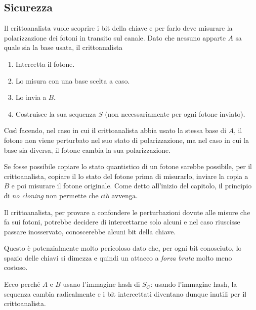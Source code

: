 \subsection{Sicurezza}
Il crittoanalista vuole scoprire i bit della chiave e per farlo deve misurare la polarizzazione dei fotoni in transito
sul canale. Dato che nessuno apparte $A$ sa quale sia la base usata, il crittoanalista
\begin{enumerate}
	\item Intercetta il fotone.
	\item Lo misura con una base scelta a caso.
	\item Lo invia a $B$.
	\item Costruisce la sua sequenza $S$ (non necessariamente per ogni fotone inviato).
\end{enumerate}
Cos\`i facendo, nel caso in cui il crittoanalista abbia usato la stessa base di $A$, il fotone non viene perturbato
nel suo stato di polarizzazione, ma nel caso in cui la base sia diversa, il fotone cambia la sua polarizzazione.

Se fosse possibile copiare lo stato quantistico di un fotone sarebbe possibile, per il crittoanalista, copiare il
lo stato del fotone prima di misurarlo, inviare la copia a $B$ e poi misurare il fotone originale. Come detto
all'inizio del capitolo, il principio di \emph{no cloning} non permette che ci\`o avvenga.

Il crittoanalista, per provare a confondere le perturbazioni dovute alle misure che fa sui fotoni, potrebbe decidere
di intercettarne solo alcuni e nel caso riuscisse passare inosservato, conoscerebbe alcuni bit della chiave.

Questo \`e potenzialmente molto pericoloso dato che, per ogni bit conosciuto, lo spazio delle chiavi si dimezza e quindi
un attacco a \emph{forza bruta} molto meno costoso.

Ecco perch\'e $A$ e $B$ usano l'immagine hash di $S_C$: usando l'immagine hash, la sequenza cambia radicalmente e i bit
intercettati diventano dunque inutili per il crittoanalista.